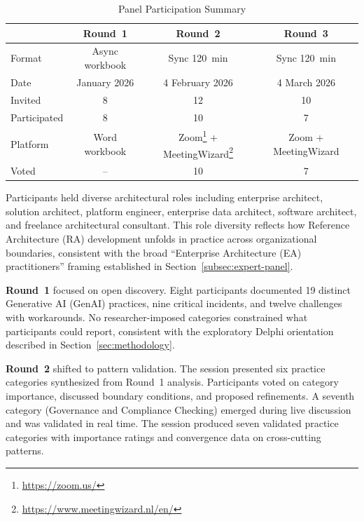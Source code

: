 \begin{table}[!ht]
    \centering
    \caption{Panel Participation Summary}\label{tab:panel-participation}
    \begin{tabular}{|l|c|c|c|}
        \hline
        & \textbf{Round~1} & \textbf{Round~2} & \textbf{Round~3} \\
        \hline
        Format & Async workbook & Sync 120~min & Sync 120~min \\
        \hline
        Date & January 2026 & 4 February 2026 & 4 March 2026 \\
        \hline
        Invited & 8 & 12 & 10 \\
        \hline
        Participated & 8 & 10 & 7 \\
        \hline
        Platform & Word workbook & Zoom\footnote{\url{https://zoom.us/}} + MeetingWizard\footnote{\url{https://www.meetingwizard.nl/en/}} & Zoom + MeetingWizard \\
        \hline
        Voted & -- & 10 & 7 \\
        \hline
    \end{tabular}
\end{table}

Participants held diverse architectural roles including enterprise architect,
solution architect, platform engineer, enterprise data architect, software
architect, and freelance architectural consultant. This role diversity reflects
how Reference Architecture (RA) development unfolds in practice across
organizational boundaries, consistent with the broad ``Enterprise Architecture (EA) practitioners''
framing established in Section~\ref{subsec:expert-panel}.

\textbf{Round~1} focused on open discovery. Eight participants documented
19 distinct Generative AI (GenAI) practices, nine critical
incidents, and twelve challenges with workarounds. No researcher-imposed
categories constrained what participants could report, consistent with the
exploratory Delphi orientation described in Section~\ref{sec:methodology}.

\textbf{Round~2} shifted to pattern validation. The session presented six
practice categories synthesized from Round~1 analysis. Participants voted on
category importance, discussed boundary conditions, and proposed refinements. A
seventh category (Governance and Compliance Checking) emerged during live
discussion and was validated in real time. The session produced seven validated
practice categories with importance ratings and convergence data on cross-cutting
patterns.

